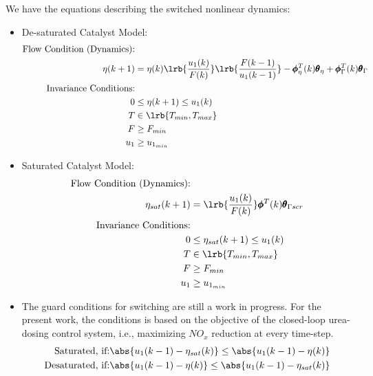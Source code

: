 We have the equations describing the switched nonlinear dynamics:
\begin{itemize}
\item De-saturated Catalyst Model:
\begin{align*}
        \text{Flow Condition (Dynamics):} &\\
                \eta(k+1) &= \eta(k) \lrb{\frac{u_1(k)}{F(k)}} \lrb{\frac{F(k-1)}{u_1(k-1)}}
                    - \pmb \phi^T_{\eta}(k) \pmb \theta_{\eta}  + \pmb \phi_{\Gamma}^T(k) \pmb \theta_{\Gamma}
                    \\
        \text{Invariance Conditions:} & \\
                0 &\leq \eta (k+1) \leq u_1(k)\\
                T &\in \lrb{T_{min}, T_{max}}\\
                F &\geq F_{min}\\
                u_1 &\geq u_{1_{min}}
\end{align*}
\item Saturated Catalyst Model:
\begin{align*}
        \text{Flow Condition (Dynamics):} & \\
                \eta_{sat}(k+1) &= \lrb{\frac{u_1(k)}{F(k)}} \pmb \phi^T(k) \pmb \theta_{\Gamma scr}\\
        \text{Invariance Conditions:} & \\
                0 &\leq \eta_{sat} (k+1) \leq u_1(k)\\
                T &\in \lrb{T_{min}, T_{max}}\\
                F &\geq F_{min}\\
                u_1 &\geq u_{1_{min}}
\end{align*}

\item The guard conditions for switching are still a work in progress. For the present work, the conditions is based on the objective of the closed-loop urea-dosing control system, i.e., maximizing $NO_x$ reduction at every time-step.
\begin{align*}
        \text{Saturated, if:} & \abs{u_1(k-1) - \eta_{sat}(k)} \leq \abs{u_1(k-1) - \eta(k)} \\
        \text{Desaturated, if:} & \abs{u_1(k-1) - \eta(k)} \leq \abs{u_1(k-1) - \eta_{sat}(k)}
\end{align*}
\end{itemize}



